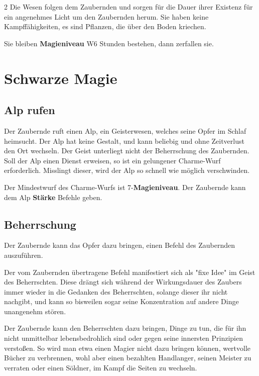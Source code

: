 \begin{multicols*}{2}
Die Wesen folgen dem Zaubernden und sorgen für die Dauer ihrer Existenz für ein angenehmes Licht um den Zaubernden herum. Sie haben keine Kampffähigkeiten, es sind Pflanzen, die über den Boden kriechen.

Sie bleiben \textbf{Magieniveau} W6 Stunden bestehen, dann zerfallen sie.



\section{Schwarze Magie}

\subsection{Alp rufen}

Der Zaubernde ruft einen Alp, ein Geisterwesen, welches seine Opfer im Schlaf heimsucht. Der Alp hat keine Gestalt, und kann beliebig und ohne Zeitverlust den Ort wechseln. Der Geist unterliegt nicht der Beherrschung des Zaubernden. Soll der Alp einen Dienst erweisen, so ist ein gelungener Charme-Wurf erforderlich. Misslingt dieser, wird der Alp so schnell wie möglich verschwinden.

Der Mindestwurf des Charme-Wurfs ist 7-\textbf{Magieniveau}. Der Zaubernde kann dem Alp \textbf{Stärke} Befehle geben.



\subsection{Beherrschung}

Der Zaubernde kann das Opfer dazu bringen, einen Befehl des Zaubernden auszuführen.

Der vom Zaubernden übertragene Befehl manifestiert sich als "fixe Idee" im Geist des Beherrschten. Diese drängt sich während der Wirkungsdauer des Zaubers immer wieder in die Gedanken des Beherrschten, solange dieser ihr nicht nachgibt, und kann so bisweilen sogar seine Konzentration auf andere Dinge unangenehm stören.

Der Zaubernde kann den Beherrschten dazu bringen, Dinge zu tun, die für ihn nicht unmittelbar lebensbedrohlich sind oder gegen seine innersten Prinzipien verstoßen. So wird man etwa einen Magier nicht dazu bringen können, wertvolle Bücher zu verbrennen, wohl aber einen bezahlten Handlanger, seinen Meister zu verraten oder einen Söldner, im Kampf die Seiten zu wechseln.


\end{multicols*}
